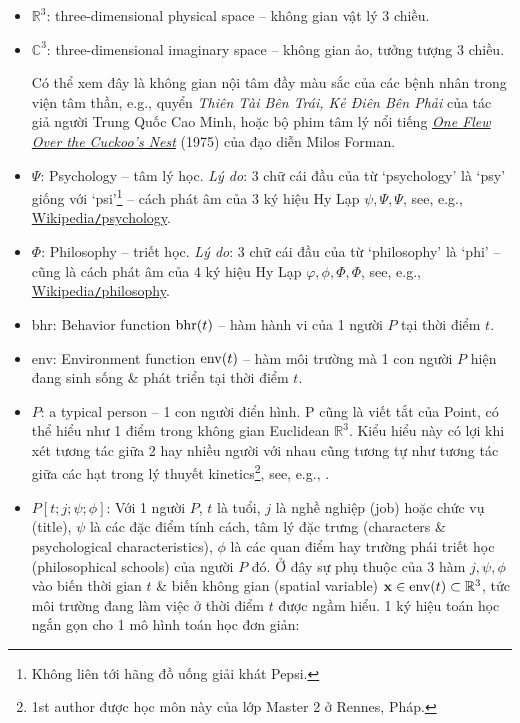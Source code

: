 \documentclass[12pt]{article}
\begin{document}
\begin{itemize}
	\item $\mathbb{R}^3$: three-dimensional physical space -- không gian vật lý 3 chiều.
	\item $\mathbb{C}^3$: three-dimensional imaginary space -- không gian ảo, tưởng tượng 3 chiều.
	
	Có thể xem đây là không gian nội tâm đầy màu sắc của các bệnh nhân trong viện tâm thần, e.g., quyển {\it Thiên Tài Bên Trái, Kẻ Điên Bên Phải} của tác giả người Trung Quốc {\sc Cao Minh}, hoặc bộ phim tâm lý nổi tiếng \href{https://www.imdb.com/title/tt0073486}{\it One Flew Over the Cuckoo's Nest} (1975) của đạo diễn {\sc Milos Forman}.
	\item $\Psi$: Psychology -- tâm lý học. {\it Lý do}: 3 chữ cái đầu của từ `psychology' là `psy' giống với `psi'\footnote{Không liên tới hãng đồ uống giải khát Pepsi.} -- cách phát âm của 3 ký hiệu Hy Lạp $\psi,\Psi,\varPsi$, see, e.g., \href{https://en.wikipedia.org/wiki/Psychology}{Wikipedia{\tt/}psychology}.
	\item $\Phi$: Philosophy -- triết học. {\it Lý do}: 3 chữ cái đầu của từ `philosophy' là `phi' -- cũng là cách phát âm của 4 ký hiệu Hy Lạp $\varphi,\phi,\Phi,\varPhi$, see, e.g., \href{https://en.wikipedia.org/wiki/Philosophy}{Wikipedia{\tt/}philosophy}.
	\item bhr: Behavior function ${\rm bhr}(t)$ -- hàm hành vi của 1 người $P$ tại thời điểm $t$.
	\item env: Environment function ${\rm env}(t)$ -- hàm môi trường mà 1 con người $P$ hiện đang sinh sống \& phát triển tại thời điểm $t$.
	\item $P$: a typical person -- 1 con người điển hình. P cũng là viết tắt của Point, có thể hiểu như 1 điểm trong không gian Euclidean $\mathbb{R}^3$. Kiểu hiểu này có lợi khi xét tương tác giữa 2 hay nhiều người với nhau cũng tương tự như tương tác giữa các hạt trong lý thuyết kinetics\footnote{1st author được học môn này của lớp Master 2 ở Rennes, Pháp.}, see, e.g., \cite{Tartar2008}.
	\item $P[t;j;\psi;\phi]$: Với 1 người $P$, $t$ là tuổi, $j$ là nghề nghiệp (job) hoặc chức vụ (title), $\psi$ là các đặc điểm tính cách, tâm lý đặc trưng (characters \& psychological characteristics), $\phi$ là các quan điểm hay trường phái triết học (philosophical schools) của người $P$ đó. Ở đây sự phụ thuộc của 3 hàm $j,\psi,\phi$ vào biến thời gian $t$ \& biến không gian (spatial variable) ${\bf x}\in{\rm env}(t)\subset\mathbb{R}^3$, tức môi trường đang làm việc ở thời điểm $t$ được ngầm hiểu. 1 ký hiệu toán học ngắn gọn cho 1 mô hình toán học đơn giản:

\end{itemize}
\end{document}
